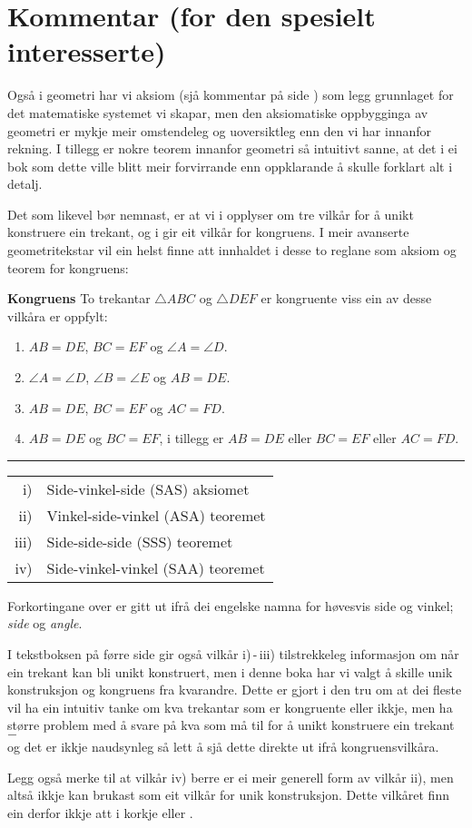 



\section*{Kommentar (for den spesielt interesserte)}
Også i geometri har vi aksiom (sjå kommentar på side \pageref{Kommentar1}) som legg grunnlaget for det matematiske systemet vi skapar, men den aksiomatiske oppbygginga av geometri er mykje meir omstendeleg og uoversiktleg enn den vi har innanfor rekning. I tillegg er nokre teorem innanfor geometri så intuitivt sanne, at det i ei bok som dette ville blitt meir forvirrande enn oppklarande å skulle forklart alt i detalj.\vsk

Det som likevel bør nemnast, er at vi i  opplyser om tre vilkår for å unikt konstruere ein trekant, og i  gir eit vilkår for kongruens. I meir avanserte geometritekstar vil ein helst finne att innhaldet i desse to reglane som aksiom og teorem for kongruens: \regv

\begin{tcolorbox}[boxrule=0.3 mm,arc=0mm,colback=blue!5] {\large \textbf{Kongruens} \vspace{5 pt}}\newline
	To trekantar $ \triangle ABC $ og $ \triangle DEF $ er kongruente viss ein av desse vilkåra er oppfylt:
	\begin{enumerate}[label=\roman*)]
		\item $ AB=DE $, $ BC=EF $ og $ \angle A=\angle D $.
		\item $ \angle A=\angle D $, $ \angle B=\angle E $ og $ AB=DE $.
		\item $ AB=DE $, $ BC=EF $ og $ AC=FD $.
		\item $ AB=DE $ og $ BC=EF $, i tillegg er $ AB=DE $ eller $ BC=EF $ eller $ AC=FD $.
	\end{enumerate}
\rule{1\linewidth}{0.75bp}
\begin{center}
	\begin{tabular}{rl}
		i) &Side-vinkel-side (SAS) aksiomet\\
		ii) &Vinkel-side-vinkel (ASA) teoremet\\
		iii) & Side-side-side (SSS) teoremet \\
		iv) & Side-vinkel-vinkel (SAA) teoremet 
	\end{tabular}
\end{center}
\mer Forkortingane over er gitt ut ifrå dei engelske namna for høvesvis side og vinkel; \textit{side} og \textit{angle}.
\end{tcolorbox}
\newpage
I tekstboksen på førre side gir også vilkår i)\,-\,iii) tilstrekkeleg informasjon om når ein trekant kan bli unikt konstruert, men i denne boka har vi valgt å skille unik konstruksjon og kongruens fra kvarandre. Dette er gjort i den tru om at dei fleste vil ha ein intuitiv tanke om kva trekantar som er kongruente eller ikkje, men ha større problem med å svare på kva som må til for å unikt konstruere ein trekant $ - $ \\og det er ikkje naudsynleg så lett å sjå dette direkte ut ifrå kongruensvilkåra.\vsk

Legg også merke til at vilkår iv) berre er ei meir generell form av vilkår ii), men altså ikkje kan brukast som eit vilkår for unik konstruksjon. Dette vilkåret finn ein derfor ikkje att i korkje  eller .


